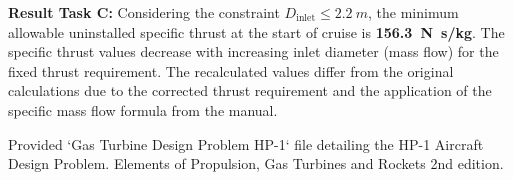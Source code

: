 \documentclass{article}
\begin{document}
\textbf{Result Task C:} Considering the constraint $D_{\text{inlet}} \le \SI{2.2}{m}$, the minimum allowable uninstalled specific thrust at the start of cruise is \textbf{\SI{156.3}{N.s/kg}}. The specific thrust values decrease with increasing inlet diameter (mass flow) for the fixed thrust requirement. The recalculated values differ from the original calculations due to the corrected thrust requirement and the application of the specific mass flow formula from the manual.

\begin{thebibliography}{9}
     Provided `Gas Turbine Design Problem HP-1` file detailing the HP-1 Aircraft Design Problem.
     Elements of Propulsion, Gas Turbines and Rockets 2nd edition.
\end{thebibliography}
\end{document}
